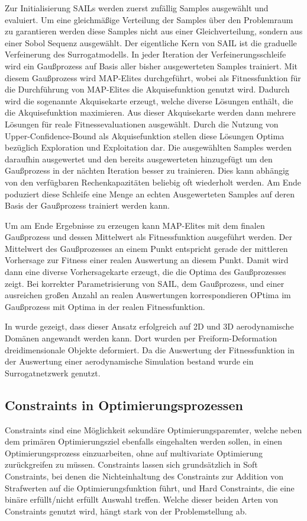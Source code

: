 Zur Initialisierung SAILs werden zuerst zufällig Samples ausgewählt und evaluiert.
Um eine gleichmäßige Verteilung der Samples über den Problemraum zu garantieren werden diese Samples nicht aus einer Gleichverteilung, sondern aus einer Sobol Sequenz ausgewählt.
Der eigentliche Kern von SAIL ist die graduelle Verfeinerung des Surrogatmodells.
In jeder Iteration der Verfeinerungsschleife wird ein Gaußprozess auf Basis aller bisher ausgewerteten Samples trainiert.
Mit diesem Gaußprozess wird MAP-Elites durchgeführt, wobei als Fitnessfunktion für die Durchführung von MAP-Elites die Akquisefunktion genutzt wird.
Dadurch wird die sogenannte Akquisekarte erzeugt, welche diverse Lösungen enthält, die die Akquisefunktion maximieren.
Aus dieser Akquisekarte werden dann mehrere Lösungen für reale Fitnessevaluationen ausgewählt.
Durch die Nutzung von Upper-Confidence-Bound als Akquisefunktion stellen diese Lösungen Optima bezüglich Exploration und Exploitation dar.
Die ausgewählten Samples werden daraufhin ausgewertet  und den bereits ausgewerteten hinzugefügt um den Gaußprozess in der nächten Iteration besser zu trainieren.
Dies kann abhängig von den verfügbaren Rechenkapazitäten beliebig oft wiederholt werden.
Am Ende poduziert diese Schleife eine Menge an echten Ausgewerteten Samples auf deren Basis der Gaußprozess trainiert werden kann.

Um am Ende Ergebnisse zu erzeugen kann MAP-Elites mit dem finalen Gaußprozess und dessen Mittelwert als Fitnessfunktion ausgeführt werden.
Der Mittelwert des Gaußprozesses an einem Punkt entspricht gerade der mittleren Vorhersage zur Fitness einer realen Auswertung an diesem Punkt.
Damit wird dann eine diverse Vorhersagekarte erzeugt, die die Optima des Gaußprozesses zeigt.
Bei korrekter Parametrisierung von SAIL, dem Gaußprozess, und einer ausreichen großen Anzahl an realen Auswertungen korrespondieren OPtima im Gaußprozess mit Optima in der realen Fitnessfunktion.

In \cite{Gaier.6152018} wurde gezeigt, dass dieser Ansatz erfolgreich auf 2D und 3D aerodynamische Domänen angewandt werden kann.
Dort wurden per Freiform-Deformation dreidimensionale Objekte deformiert.
Da die Auswertung der Fitnessfunktion in der Auswertung einer aerodynamische Simulation bestand wurde ein Surrogatnetzwerk genutzt.


\subsection{Constraints in Optimierungsprozessen}
Constraints sind eine Möglichkeit sekundäre Optimierungsparemter, welche neben dem primären Optimierungsziel ebenfalls eingehalten werden sollen, in einen Optimierungsprozess einzuarbeiten, ohne auf multivariate Optimierung zurückgreifen zu müssen.
Constraints lassen sich grundsätzlich in Soft Constraints, bei denen die Nichteinhaltung des Constraints zur Addition von Strafwerten auf die Optimierungsfunktion führt, und Hard Constraints, die eine binäre erfüllt/nicht erfüllt Auswahl treffen.
Welche dieser beiden Arten von Constraints genutzt wird, hängt stark von der Problemstellung ab.

